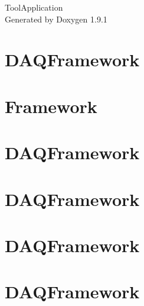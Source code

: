 \let\mypdfximage\pdfximage\def\pdfximage{\immediate\mypdfximage}\documentclass[twoside]{book}
\newcommand{\+}{\discretionary{\mbox{\scriptsize$\hookleftarrow$}}{}{}}
\newcommand{\clearemptydoublepage}{%
  \newpage{\pagestyle{empty}\cleardoublepage}%
}
\begin{document}
\raggedbottom

\hypersetup{pageanchor=false,
             bookmarksnumbered=true,
             pdfencoding=unicode
            }
\begin{titlepage}
\vspace*{7cm}
\begin{center}%
{\Large Tool\+Application }\\
\vspace*{1cm}
{\large Generated by Doxygen 1.9.1}\\
\end{center}
\end{titlepage}
\clearemptydoublepage
{}
\tableofcontents
\clearemptydoublepage
{}
\hypersetup{pageanchor=true}

\chapter{DAQFramework}
\label{md_UserTools_FakeDataSource_README}

\chapter{Framework}
\label{md_UserTools_ImportedTools_README}

\chapter{DAQFramework}
\label{md_UserTools_InactiveTools_README}

\chapter{DAQFramework}
\label{md_UserTools_InactiveTools_WebSocketApp_README}

\chapter{DAQFramework}
\label{md_UserTools_JobManager_README}

\chapter{DAQFramework}
\label{md_UserTools_README}

\end{document}
